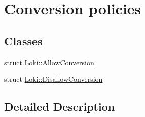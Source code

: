 \hypertarget{group__SmartPointerConversionGroup}{}\section{Conversion policies}
\label{group__SmartPointerConversionGroup}
\subsection*{Classes}
\begin{DoxyCompactItemize}
\item 
struct \hyperlink{structLoki_1_1AllowConversion}{Loki\+::\+Allow\+Conversion}
\item 
struct \hyperlink{structLoki_1_1DisallowConversion}{Loki\+::\+Disallow\+Conversion}
\end{DoxyCompactItemize}


\subsection{Detailed Description}
